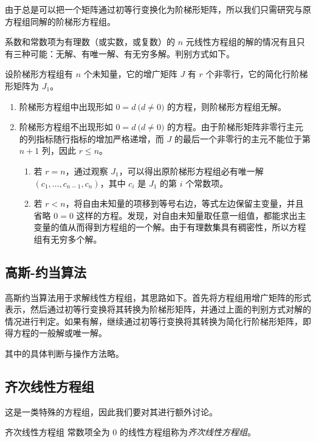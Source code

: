 由于总是可以把一个矩阵通过初等行变换化为阶梯形矩阵，所以我们只需研究与原方程组同解的阶梯形方程组。

\begin{theorem}
	系数和常数项为有理数（或实数，或复数）的 $n$ 元线性方程组的解的情况有且只有三种可能：无解、有唯一解、有无穷多解。判别方式如下。

	设阶梯形方程组有 $n$ 个未知量，它的增广矩阵 $J$ 有 $r$ 个非零行，它的简化行阶梯形矩阵为 $J_1$。
	\begin{enumerate}
		\item 阶梯形方程组中出现形如 $0 = d \pod{d \ne 0}$ 的方程，则阶梯形方程组无解。
		\item 阶梯形方程组不出现形如 $0 = d \pod{d \ne 0}$ 的方程。由于阶梯形矩阵非零行主元的列指标随行指标的增加严格递增，而 $J$ 的最后一个非零行的主元不能位于第 $n + 1$ 列，因此 $r \le n$。
		\begin{enumerate}
			\item 若 $r = n$，通过观察 $J_1$，可以得出原阶梯形方程组必有唯一解 $(c_1, \ldots, c_{n - 1}, c_n)$，其中 $c_i$ 是 $J_1$ 的第 $i$ 个常数项。
			\item 若 $r < n$，将自由未知量的项移到等号右边，等式左边保留主变量，并且省略 $0 = 0$ 这样的方程。发现，对自由未知量取任意一组值，都能求出主变量的值从而得到方程组的一个解。由于有理数集具有稠密性，所以方程组有无穷多个解。
		\end{enumerate}
	\end{enumerate}
\end{theorem}

\subsection{高斯-约当算法}

高斯约当算法用于求解线性方程组，其思路如下。首先将方程组用增广矩阵的形式表示，然后通过初等行变换将其转换为阶梯形矩阵，并通过上面的判别方式对解的情况进行判定。如果有解，继续通过初等行变换将其转换为简化行阶梯形矩阵，即得方程的一般解或唯一解。

其中的具体判断与操作方法略。

\subsection{齐次线性方程组}

这是一类特殊的方程组，因此我们要对其进行额外讨论。

\begin{definition}{齐次线性方程组}
	常数项全为 $0$ 的线性方程组称为\emph{齐次线性方程组}。
\end{definition}

